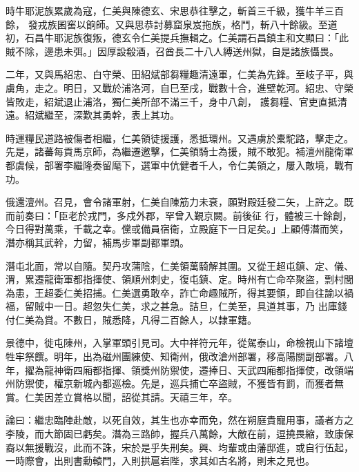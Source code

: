 \begin{pinyinscope}
 時牛耶泥族累歲為寇，仁美與陳德玄、宋思恭往擊之，斬首三千級，獲牛羊三百餘，
 發戎族囷窖以餉師。又與思恭討募窟泉岌拖族，格鬥，斬八十餘級。至道初，石昌牛耶泥族復叛，德玄令仁美提兵撫輯之。仁美謂石昌鎮主和文顯曰：「此賊不除，邊患未弭。」因厚設殽酒，召酋長二十八人縛送州獄，自是諸族懾畏。



 二年，又與馬紹忠、白守榮、田紹斌部芻糧趣清遠軍，仁美為先鋒。至岐子平，與虜角，走之。明日，又戰於浦洛河，自巳至戌，戰數十合，進壁乾河。紹忠、守榮皆敗走，紹斌退止浦洛，獨仁美所部不滿三千，身中八創，
 護芻糧、官吏直抵清遠。紹斌繼至，深歎其勇幹，表上其功。



 時運糧民道路被傷者相繼，仁美領徒援護，悉抵環州。又遇虜於橐駝路，擊走之。先是，諸蕃每貢馬京師，為繼遷邀擊，仁美領騎士為援，賊不敢犯。補澶州龍衛軍都虞候，部署李繼隆奏留麾下，選軍中伉健者千人，令仁美領之，屢入敵境，戰有功。



 俄還澶州。召見，會令諸軍射，仁美自陳筋力未衰，願對殿廷發二矢，上許之。既而前奏曰：「臣老於戎門，多戍外郡，罕曾入覲京闕。前後征
 行，體被三十餘創，今日得對萬乘，千載之幸。儻或備員宿衛，立殿庭下一日足矣。」上顧傅潛而笑，潛亦稱其武幹，力留，補馬步軍副都軍頭。



 潛屯北面，常以自隨。契丹攻蒲陰，仁美領萬騎解其圍。又從王超屯鎮、定、儀、渭，累遷龍衛軍都指揮使、領順州刺史，復屯鎮、定。時州有亡命卒聚盜，剽村閭為患，王超委仁美招捕。仁美選勇敢卒，詐亡命趣賊所，得其要領，即自往諭以禍福，留賊中一日。超忽失仁美，求之甚急。詰旦，仁美至，具道其事，乃
 出庫錢付仁美為賞。不數日，賊悉降，凡得二百餘人，以隸軍籍。



 景德中，徙屯陳州，入掌軍頭引見司。大中祥符元年，從駕泰山，命檢視山下諸壇牲牢祭饌。明年，出為磁州團練使、知衛州，俄改滄州部署，移高陽關副部署。八年，擢為龍神衛四廂都指揮、領獎州防禦使，遷捧日、天武四廂都指揮使，改領端州防禦使，權京新城內都巡檢。先是，巡兵捕亡卒盜賊，不獲皆有罰，而獲者無賞。仁美因差立賞格以聞，詔從其請。天禧三年，卒。



 論曰：繼忠臨陣赴敵，以死自效，其生也亦幸而免，然在朔庭貴寵用事，議者方之李陵，而大節固已虧矣。潛為三路帥，握兵八萬餘，大敵在前，逗撓畏縮，致康保裔以無援戰沒，此而不誅，宋於是乎失刑矣。興、均輩或由藩邸進，或自行伍起，一時際會，出則書勳轅門，入則拱扈岩陛，求其如古名將，則未之見也。



\end{pinyinscope}